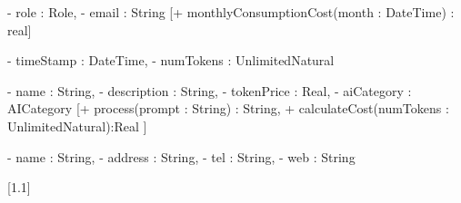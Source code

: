 \documentclass{article}
\begin{document}
{
	- role : Role,
	- email : String
}[+ monthlyConsumptionCost(month : DateTime) : real]

{
	- timeStamp : DateTime,
	- numTokens : UnlimitedNatural
}

{
	- name : String,
	- description : String,
	- tokenPrice : Real,
	- aiCategory : AICategory
}[+ process(prompt : String) : String, + calculateCost(numTokens : UnlimitedNatural):Real	]

{
	- name : String,
	- address : String,
	- tel : String,
	- web : String
}

[1.1\linewidth]
\end{document}
